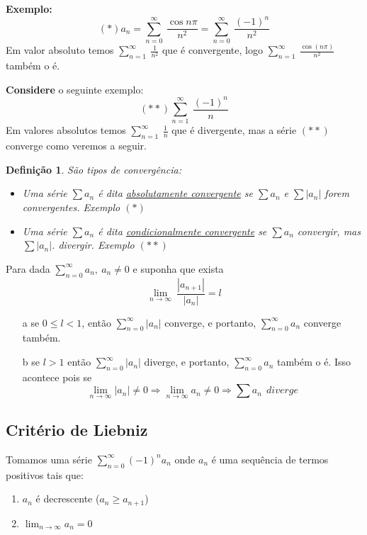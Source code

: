 \documentclass[12pt,openany, letterpaper]{book}
\newtheorem{definition}{Definição}[section]
\begin{document}
\textbf{Exemplo:} $$(*) a_n = \sum_{n=0}^{\infty} \ \frac{\cos n\pi}{n^2} = \sum_{n=0}^{\infty} \ \frac{(-1)^n}{n^2}$$ Em valor absoluto temos $\displaystyle{\sum_{n=1}^{\infty} \ \frac{1}{n^2}}$ que é convergente, logo $\displaystyle{\sum_{n=1}^{\infty} \ \frac{\cos(n\pi)}{n^2}}$ também o é.

\textbf{Considere} o seguinte exemplo: $$(**) \sum_{n=1}^{\infty} \ \frac{(-1)^n}{n}$$ Em valores absolutos temos $\displaystyle{\sum_{n=1}^{\infty} \ \frac{1}{n}}$ que é divergente, mas a série $(**)$ converge como veremos a seguir. 

\begin{definition} São tipos de convergência:
\begin{itemize}
\item Uma série $\sum a_n$ é dita \underline{absolutamente convergente} se $\sum a_n$ e $\sum |a_n|$ forem convergentes. Exemplo $(*)$
\item Uma série $\sum a_n$ é dita \underline{condicionalmente convergente} se $\sum a_n$ convergir, mas $\sum |a_n|$. divergir. Exemplo $(**)$
\end{itemize}
\end{definition}

Para dada $\displaystyle{\sum_{n=0}^{\infty} a_n, \ a_n \neq 0}$ e suponha que exista $$\lim_{n \rightarrow \infty} \ \frac{|a_{n+1}|}{|a_n|} = l$$

\begin{itemize}
\item [a] se $0 \leq l <1$, então $\displaystyle{\sum_{n=0}^{\infty} |a_n|}$ converge, e portanto, $\displaystyle{\sum_{n=0}^{\infty} a_n}$ converge também.
\item [b] se $l > 1$ então $\displaystyle{\sum_{n=0}^{\infty} |a_n|}$ diverge, e portanto, $\displaystyle{\sum_{n=0}^{\infty} a_n}$ também o é. Isso acontece pois se $$ \lim_{n \rightarrow \infty} |a_n| \neq 0 \Rightarrow \lim_{n \rightarrow \infty} a_n \neq 0 \Rightarrow \sum a_n \ \ diverge$$
\end{itemize}

\subsection{Critério de Liebniz}
\label{subsec:2121}

\hspace{5mm}Tomamos uma série $\displaystyle{\sum_{n=0}^{\infty} (-1)^n a_n}$ onde $a_n$ é uma sequência de termos positivos tais que: \begin{enumerate}
\item $a_n$ é decrescente ($a_n \geq a_{n+1}$)
\item $\displaystyle{\lim_{n \rightarrow \infty} a_n = 0}$
\end{enumerate}
\end{document}
